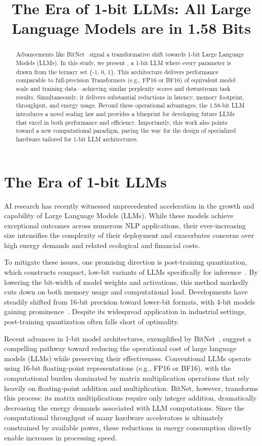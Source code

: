 \title{The Era of 1-bit LLMs: All Large Language Models are in 1.58 Bits}

\begin{abstract}
Advancements like BitNet~\cite{bitnet} signal a transformative shift towards 1-bit Large Language Models (LLMs). In this study, we present \textbf{}, a 1-bit LLM where every parameter is drawn from the ternary set \{-1, 0, 1\}. This architecture delivers performance comparable to full-precision Transformers (e.g., FP16 or BF16) of equivalent model scale and training data—achieving similar perplexity scores and downstream task results. Simultaneously, it delivers substantial reductions in latency, memory footprint, throughput, and energy usage. Beyond these operational advantages, the 1.58-bit LLM introduces a novel scaling law and provides a blueprint for developing future LLMs that excel in both performance and efficiency. Importantly, this work also points toward a new computational paradigm, paving the way for the design of specialized hardware tailored for 1-bit LLM architectures.
\end{abstract}

\section{The Era of 1-bit LLMs}

AI research has recently witnessed unprecedented acceleration in the growth and capability of Large Language Models (LLMs). While these models achieve exceptional outcomes across numerous NLP applications, their ever-increasing size intensifies the complexity of their deployment and exacerbates concerns over high energy demands and related ecological and financial costs.

To mitigate these issues, one promising direction is post-training quantization, which constructs compact, low-bit variants of LLMs specifically for inference~\cite{smoothquant, gptq, quip, quip_sharp}. By lowering the bit-width of model weights and activations, this method markedly cuts down on both memory usage and computational load. Developments have steadily shifted from 16-bit precision toward lower-bit formats, with 4-bit models gaining prominence~\cite{gptq, awq}. Despite its widespread application in industrial settings, post-training quantization often falls short of optimality.

Recent advances in 1-bit model architectures, exemplified by BitNet~\cite{bitnet}, suggest a compelling pathway toward reducing the operational cost of large language models (LLMs) while preserving their effectiveness. Conventional LLMs operate using 16-bit floating-point representations (e.g., FP16 or BF16), with the computational burden dominated by matrix multiplication operations that rely heavily on floating-point addition and multiplication. BitNet, however, transforms this process: its matrix multiplications require only integer addition, dramatically decreasing the energy demands associated with LLM computations. Since the computational throughput of many hardware accelerators is ultimately constrained by available power, these reductions in energy consumption directly enable increases in processing speed.


